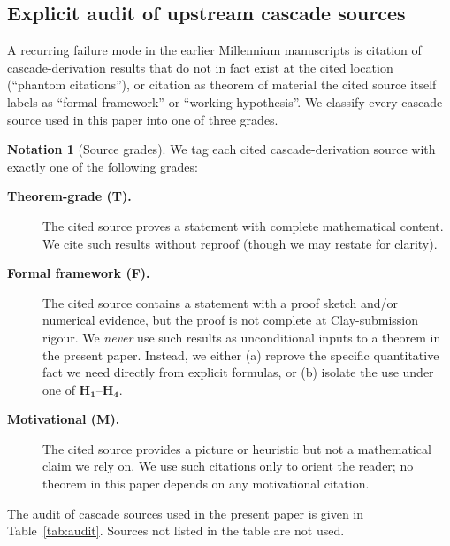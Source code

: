 \documentclass[11pt, a4paper]{amsart}
\theoremstyle{definition}
\newtheorem{notation}[theorem]{Notation}
\begin{document}
\subsection{Explicit audit of upstream cascade sources}
\label{subsec:audit-upstream}
\label{sec:audit}

A recurring failure mode in the earlier Millennium manuscripts is
citation of cascade-derivation results that do not in fact exist
at the cited location (``phantom citations''), or citation as
theorem of material the cited source itself labels as ``formal
framework'' or ``working hypothesis''. We classify every cascade
source used in this paper into one of three grades.

\begin{notation}[Source grades]
\label{not:grades}
We tag each cited cascade-derivation source with exactly one of
the following grades:
\begin{description}
\item[\textbf{Theorem-grade (T).}] The cited source proves a
  statement with complete mathematical content. We cite such
  results without reproof (though we may restate for clarity).
\item[\textbf{Formal framework (F).}] The cited source contains a
  statement with a proof sketch and/or numerical evidence, but
  the proof is not complete at Clay-submission rigour. We
  \emph{never} use such results as unconditional inputs to a
  theorem in the present paper. Instead, we either (a) reprove
  the specific quantitative fact we need directly from explicit
  formulas, or (b) isolate the use under one of
  $\mathbf{H_1}$--$\mathbf{H_4}$.
\item[\textbf{Motivational (M).}] The cited source provides a
  picture or heuristic but not a mathematical claim we rely on.
  We use such citations only to orient the reader; no theorem
  in this paper depends on any motivational citation.
\end{description}
\end{notation}

The audit of cascade sources used in the present paper is given in
Table~\ref{tab:audit}. Sources not listed in the table are not used.
\end{document}
